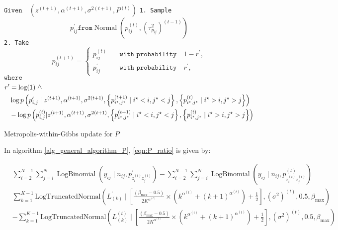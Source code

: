 \documentclass[11pt]{amsart}
\newcommand{\vertg}{\rotatebox{90}{$>$}}
\begin{document}
\begin{algorithm}
\begin{algorithmic}[h]
\State $\texttt{Given} \quad \left(z^{(t+1)},\alpha^{(t+1)},\sigma^{2(t+1)},P^{(t)}\right)  $
\State
{}
        \State \texttt{1. Sample} \begin{equation}\label{eqn_general_proposal_P}
        p^{\prime}_{ij} \texttt{from} \operatorname{Normal}\left( p^{(t)}_{ij}, (\tau^2_{p_{ij}})^{(t-1)} \right)
        \end{equation}
        \State \texttt{2. Take} \begin{equation}\label{eqn_acc_reject_P}
        p^{(t+1)}_{ij} = 
        \begin{cases}
        p^{(t)}_{ij} \quad &\texttt{with probability} \quad 1 - r^\prime, \\
        p^{\prime}_{ij} \quad &\texttt{with probability} \quad r^\prime,
        \end{cases}
        \end{equation}
        \State $\texttt{where}$ \begin{align}\label{eqn:P_ratio}
        r^\prime &= \log(1) \ \vertg \nonumber \\ 
        &\log{p \left(p^{\prime}_{i,j} \mid z^{(t+1)},\alpha^{(t+1)},\sigma^{2(t+1)}, \left\{ p_{i^\star,j^{\star}}^{(t+1)} \mid i^\star < i, j^{\star} < j \right\},  \left\{ p_{i^\star,j^{\star}}^{(t)} \mid i^\star > i, j^{\star} > j \right\} \right)}    \\ 
        &- \log{p \left(p^{(t)}_{i,j} |z^{(t+1)},\alpha^{(t+1)},\sigma^{2(t+1)}, \left\{ p_{i^\star,j^{\star}}^{(t+1)} \mid i^\star < i, j^{\star} < j \right\},  \left\{ p_{i^\star,j^{\star}}^{(t)} \mid i^\star > i, j^{\star} > j \right\}  \right)}  \nonumber
        \end{align}
    \EndFor
\EndFor
\end{algorithmic}
\caption{Metropolis-within-Gibbs update for \(P\)}
\label{alg_general_algorithm_P}
\end{algorithm}


In algorithm \eqref{alg_general_algorithm_P},  \eqref{eqn:P_ratio} is given by:

\begin{align}
&\sum_{i =2 }^{N-1} \sum_{j =i}^{N} \operatorname{LogBinomial}\left(y_{ij} \mid n_{ij}, p^{\prime}_{z^{(t)}_i z^{(t)}_j} \right)-\sum_{i =2 }^{N-1} \sum_{j =i}^{N} \operatorname{LogBinomial}\left( y_{ij} \mid n_{ij}, p^{(t)}_{z^{(t)}_i z^{(t)}_j} \right) \\
& \sum_{k=1}^{K-1} \text{LogTruncatedNormal} \left(L_{(k)}^{\prime} \mid  \left[ \frac{(\beta_{\max} - 0.5)}{2K^{\alpha^{(t)}}} \times  \left(  k^{\alpha^{(t)}} + (k+1)^{\alpha^{(t)}} \right) +\frac{1}{2} \right], (\sigma^{2})^{(t)}, 0.5, \beta_{\max}\right) \nonumber \\ 
&- \sum_{k=1}^{K-1} \text{LogTruncatedNormal}\left(L_{(k)}^{(t)} \mid \left[ \frac{(\beta_{\max} - 0.5)}{2K^{\alpha^{(t)}}} \times  \left(  k^{\alpha^{(t)}} + (k+1)^{\alpha^{(t)}} \right) +\frac{1}{2} \right], (\sigma^{2})^{(t)}, 0.5, \beta_{\max} \right) \nonumber \\  
\end{align}
\end{document}
